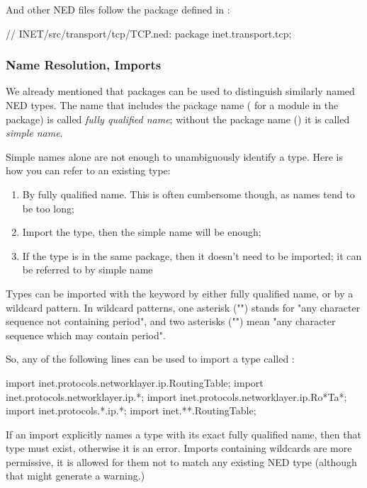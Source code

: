 And other NED files follow the package defined in :

\begin{ned}
// INET/src/transport/tcp/TCP.ned:
package inet.transport.tcp;
\end{ned}


\subsubsection{Name Resolution, Imports}

We already mentioned that packages can be used to distinguish
similarly named NED types. The name that includes the package name
( for a  module in the 
package) is called \textit{fully qualified name}; without the package
name () it is called \textit{simple name}.

Simple names alone are not enough to unambiguously identify a type.
Here is how you can refer to an existing type:

\begin{enumerate}
  \item By fully qualified name. This is often cumbersome though,
        as names tend to be too long;
  \item Import the type, then the simple name will be enough;
  \item If the type is in the same package, then it doesn't need to be
        imported; it can be referred to by simple name
\end{enumerate}

Types can be imported with the  keyword by either
fully qualified name, or by a wildcard pattern. In wildcard patterns,
one asterisk ("\ttt{*}") stands for "any character sequence not containing
period", and two asterisks ("\ttt{**}") mean "any character sequence which may
contain period".

So, any of the following lines can be used to import a type called
:

\begin{ned}
import inet.protocols.networklayer.ip.RoutingTable;
import inet.protocols.networklayer.ip.*;
import inet.protocols.networklayer.ip.Ro*Ta*;
import inet.protocols.*.ip.*;
import inet.**.RoutingTable;
\end{ned}

If an import explicitly names a type with its exact fully qualified name,
then that type must exist, otherwise it is an error. Imports containing
wildcards are more permissive, it is allowed for them not to match any
existing NED type (although that might generate a warning.)


